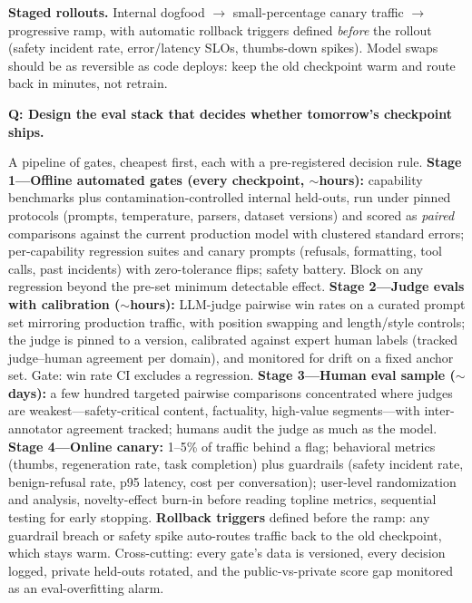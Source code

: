 \textbf{Staged rollouts.} Internal dogfood $\to$ small-percentage canary traffic $\to$ progressive ramp, with automatic rollback triggers defined \textit{before} the rollout (safety incident rate, error/latency SLOs, thumbs-down spikes). Model swaps should be as reversible as code deploys: keep the old checkpoint warm and route back in minutes, not retrain.

\begin{interviewq}
\textbf{Q: Design the eval stack that decides whether tomorrow's checkpoint ships.}

 \quad {} \quad \badgefreq{\freqhigh}

\stronganswer A pipeline of gates, cheapest first, each with a pre-registered decision rule. \textbf{Stage 1---Offline automated gates (every checkpoint, $\sim$hours):} capability benchmarks plus contamination-controlled internal held-outs, run under pinned protocols (prompts, temperature, parsers, dataset versions) and scored as \textit{paired} comparisons against the current production model with clustered standard errors; per-capability regression suites and canary prompts (refusals, formatting, tool calls, past incidents) with zero-tolerance flips; safety battery. Block on any regression beyond the pre-set minimum detectable effect. \textbf{Stage 2---Judge evals with calibration ($\sim$hours):} LLM-judge pairwise win rates on a curated prompt set mirroring production traffic, with position swapping and length/style controls; the judge is pinned to a version, calibrated against expert human labels (tracked judge--human agreement per domain), and monitored for drift on a fixed anchor set. Gate: win rate CI excludes a regression. \textbf{Stage 3---Human eval sample ($\sim$days):} a few hundred targeted pairwise comparisons concentrated where judges are weakest---safety-critical content, factuality, high-value segments---with inter-annotator agreement tracked; humans audit the judge as much as the model. \textbf{Stage 4---Online canary:} 1--5\% of traffic behind a flag; behavioral metrics (thumbs, regeneration rate, task completion) plus guardrails (safety incident rate, benign-refusal rate, p95 latency, cost per conversation); user-level randomization and analysis, novelty-effect burn-in before reading topline metrics, sequential testing for early stopping. \textbf{Rollback triggers} defined before the ramp: any guardrail breach or safety spike auto-routes traffic back to the old checkpoint, which stays warm. Cross-cutting: every gate's data is versioned, every decision logged, private held-outs rotated, and the public-vs-private score gap monitored as an eval-overfitting alarm.


\end{interviewq}
